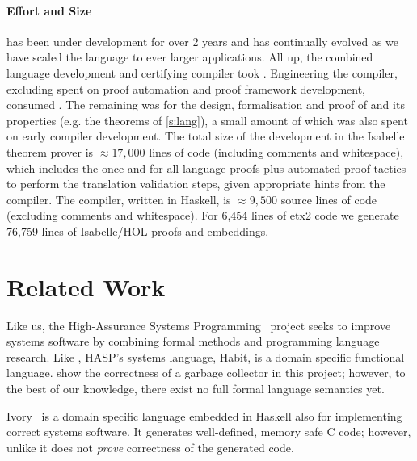 \documentclass[9pt\ifFinal\else,preprint,nocopyrightspace\fi,\ifAlpha\else natbib,authoryear\fi]{sigplanconf}
\begin{document}
\newcommand{\isabelleLOC}{$\approx 17,000$ lines of code (including comments and whitespace)\xspace}

\newcommand{\compilerSLOC}{$\approx 9,500$ source lines of code (excluding comments and whitespace)\xspace}

\newcommand{\exttwoloc}{6,454\xspace}
\newcommand{\extproof}{76,759\xspace}

\paragraph{Effort and Size} \CDSL has been
under development for over 2 years and has continually evolved
as we have scaled the language to ever larger applications.
All up, the combined language development
and certifying compiler took \totalEffort. Engineering the
\CDSL compiler, excluding \certcompEffort spent on
proof automation and proof framework development,
consumed \compilerEffort. The remaining \langproofEffort was for the
design, formalisation and proof of \CDSL and its properties (e.g. the
theorems of \autoref{s:lang}), a small amount of which was also spent on
early compiler development.
The total size of the development in
the Isabelle theorem prover is \isabelleLOC, which includes the
once-and-for-all language proofs plus automated proof tactics to perform
the translation validation steps, given appropriate hints from the \CDSL
compiler. The \CDSL compiler, written in Haskell, is \compilerSLOC.
For \exttwoloc lines of etx2 \cdsl code we generate \extproof lines of Isabelle/HOL proofs
and embeddings.



\section{Related Work}\label{s:related}

Like us, the High-Assurance Systems Programming~\citet{Habit:lang} pro\-ject 
seeks to improve systems software by combining formal 
methods and programming language research. Like \CDSL, 
HASP's systems
language, Habit, is a domain specific functional language. 
\citet{McCreight_CT_10} show the correctness of a garbage collector in this project; however, to the best 
of our knowledge, there exist no full formal language semantics yet. 

Ivory~\citep{Pike_HBEDL_14} is a domain specific language embedded in Haskell
also for implementing correct systems software. It generates well-defined,
memory safe C code; however, unlike \CDSL it does not \emph{prove} correctness
of the generated code.
\end{document}
